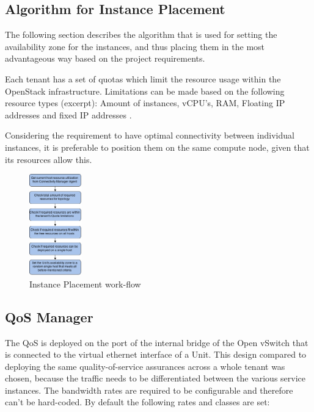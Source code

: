 \subsection{Algorithm for Instance Placement}

The following section describes the algorithm that is used for setting the availability zone for the instances, and thus placing them in the most advantageous way based on the project requirements.

Each tenant has a set of quotas which limit the resource usage within the OpenStack infrastructure. Limitations can be made based on the following resource types (excerpt): Amount of instances, vCPU's, RAM, Floating IP addresses and fixed IP addresses \cite{openstack-admin}.

Considering the requirement to have optimal connectivity between individual instances, it is preferable to position them on the same compute node, given that its resources allow this.

\begin{figure}[H]
\centering

\includegraphics[width=0.2\textwidth]{images/design/cm_instance_placement_engine.png}

\caption{Instance Placement work-flow}
\end{figure}


\subsection{QoS Manager}

The QoS is deployed on the port of the internal bridge of the Open vSwitch that is connected to the virtual ethernet interface of a Unit. This design compared to deploying the same quality-of-service assurances across a whole tenant was chosen, because the traffic needs to be differentiated between the various service instances. The bandwidth rates are required to be configurable and therefore can't be hard-coded. By default the following rates and classes are set:

